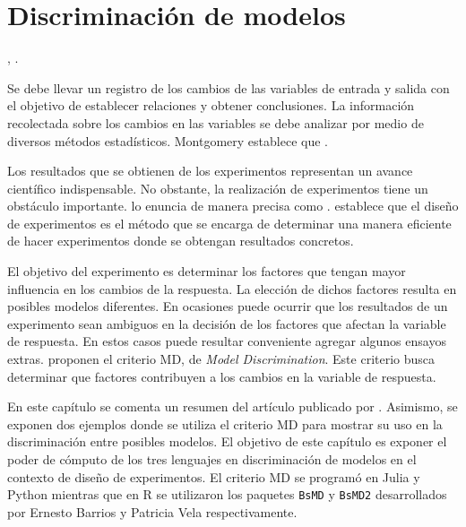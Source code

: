 \chapter{Discriminación de modelos} \label{chapter_MDopt}

, \cite{montgomery2017design}. 

Se debe llevar un registro de los cambios de las variables de entrada y salida con el objetivo de establecer relaciones y obtener conclusiones. La información recolectada sobre los cambios en las variables se debe analizar por medio de diversos métodos estadísticos. Montgomery establece que . 

Los resultados que se obtienen de los experimentos representan un avance científico indispensable. No obstante, la realización de experimentos tiene un obstáculo importante. \cite{box2005statistics} lo enuncia de manera precisa como . \cite{lawson2015design} establece que el diseño de experimentos es el método que se encarga de determinar una manera eficiente de hacer experimentos donde se obtengan resultados concretos. 

El objetivo del experimento es determinar los factores que tengan mayor influencia en los cambios de la respuesta. La elección de dichos factores resulta en posibles modelos diferentes. En ocasiones puede ocurrir que los resultados de un experimento sean ambiguos en la decisión de los factores que afectan la variable de respuesta. En estos casos puede resultar conveniente agregar algunos ensayos extras. \cite{meyer1996} proponen el criterio MD, de \textit{Model Discrimination}. Este criterio busca determinar que factores contribuyen a los cambios en la variable de respuesta. 

En este capítulo se comenta un resumen del artículo publicado por \cite{meyer1996}. Asimismo, se exponen dos ejemplos donde se utiliza el criterio MD para mostrar su uso en la discriminación entre posibles modelos. El objetivo de este capítulo es exponer el poder de cómputo de los tres lenguajes en discriminación de modelos en el contexto de diseño de experimentos. El criterio MD se programó en \textsf{Julia} y \textsf{Python} mientras que en \textsf{R} se utilizaron los paquetes \texttt{BsMD} y \texttt{BsMD2} desarrollados por Ernesto Barrios y Patricia Vela respectivamente. 

